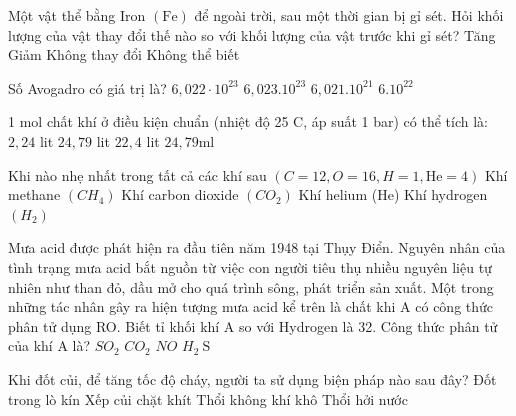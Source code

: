 \begin{ex}
	Một vật thể bằng Iron $(\mathrm{Fe})$ để ngoài trời, sau một thời gian bị gỉ sét. Hỏi khối lượng của vật thay đổi thế nào so với khối lượng của vật trước khi gỉ sét?
	\choice
	{Tăng}
	{Giảm}
	{Không thay đổi}
	{Không thể biết}
	\loigiai{}
\end{ex}

\begin{ex}
	Số Avogadro có giá trị là?
	\choice
	{$6,022\cdot 10^{23}$}
	{$6,023.10^{23}$}
	{$6,021.10^{21}$}
	{$6.10^{22}$}
	\loigiai{}
\end{ex}

\begin{ex}
	1 mol chất khí ở điều kiện chuẩn (nhiệt độ 25 C, áp suất 1 bar) có thể tích là:
	\choice
	{$2{,}24$ lit}
	{$24{,}79$ lit}
	{$22{,}4$ lit}
	{$24,79\mathrm{ml}$}
	\loigiai{}
\end{ex}

\begin{ex}
	Khi nào nhẹ nhất trong tất cả các khí sau $(C=12, O=16, H=1, \mathrm{He}=4)$ 
	\choice
	{Khí methane $\left(CH_4\right)$}
	{Khí carbon dioxide $\left(CO_2\right)$}
	{Khí helium (He)}
	{Khí hydrogen $\left(H_2\right)$}
	\loigiai{}
\end{ex}

\begin{ex}
	Mưa acid được phát hiện ra đầu tiên năm 1948 tại Thụy Điển. Nguyên nhân của tình trạng mưa acid bắt nguồn từ việc con người tiêu thụ nhiều nguyên liệu tự nhiên như than đỏ, dầu mở cho quá trình sông, phát triển sản xuất. Một trong những tác nhân gây ra hiện tượng mưa acid kể trên là chất khi A có công thức phân tử dụng RO. Biết tỉ khối khí A so với Hydrogen là 32. Công thức phân tử của khí A là?
	\choice
	{$SO_2$}
	{$CO_2$}
	{$NO$}
	{$H_2\mathrm{~S}$}
	\loigiai{}
\end{ex}

\begin{ex}
	Khi đốt củi, để tăng tốc độ cháy, người ta sử dụng biện pháp nào sau đây?
	\choice
	{Đốt trong lò kín}
	{Xếp củi chặt khít}
	{Thổi không khí khô}
	{Thổi hởi nước}
	\loigiai{}
\end{ex}

